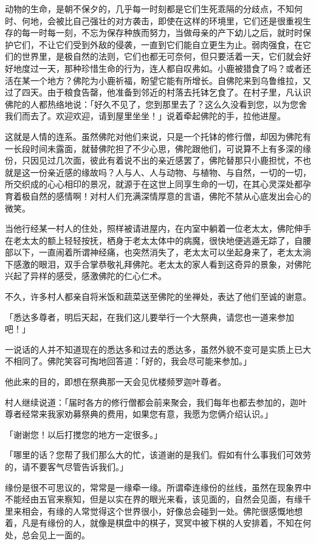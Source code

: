 \documentclass[twoside,openany]{book}
\begin{document}
动物的生命，是朝不保夕的，几乎每一时刻都是它们生死乖隔的分歧点，不知何时、何地，会被比自己强壮的对方袭击，即使在这样的环境里，它们还是很重视生存的每一时每一刻，不忘为保存种族而努力，当做母亲的产下幼儿之后，就时时保护它们，不让它们受到外敌的侵袭，一直到它们能自立更生为止。弱肉强食，在它们的世界里，是极自然的法则，它们也都无可奈何，但只要活着一天，它们就会好好地度过一天，那种珍惜生命的行为，连人都自叹弗如。小鹿被猎食了吗？或者还活在某一个地方？佛陀为小鹿祈福，盼望它能有所增长。自佛陀来到乌鲁维拉，又过了四天。由于粮食告罄，他准备到邻近的村落去托钵乞食了。在村子里，凡认识佛陀的人都热络地说：「好久不见了，您到那里去了？这么久没看到您，以为您舍我们而去了。欢迎欢迎，请到屋里坐坐！」说着牵起佛陀的手，拉他进屋。

这就是人情的连系。虽然佛陀对他们来说，只是一个托钵的修行僧，却因为佛陀有一长段时间未露面，就替佛陀担了不少心思，佛陀跟他们，可说算不上有多深的缘份，只因见过几次面，彼此有着说不出的亲近感罢了，佛陀替那只小鹿担忧，不也就是这一份亲近感的缘故吗？人与人、人与动物、与植物、与自然，一切的一切，所交织成的心心相印的景况，就源于在这世上同享生命的一切，在其心灵深处都孕育着极自然的感情啊！对村人们充满深情厚意的言语，佛陀不禁从心底发出会心的微笑。

当他行经某一村人的住处，照样被请进屋内，在内室中躺着一位老太太，佛陀伸手在老太太的额上轻轻按抚，栖身于老太太体中的病魔，很快地便逃遁无踪了，自腰部以下，一直闹着所谓神经痛，也突然消失了，老太太可以坐起身来了，老太太淌下感激的眼泪，双手合掌恭敬礼拜佛陀。老太太的家人看到这奇异的景象，对佛陀兴起了异样的感受，感激佛陀的仁心仁术。

不久，许多村人都亲自将米饭和蔬菜送至佛陀的坐禅处，表达了他们至诚的谢意。

「悉达多尊者，明后天起，在我们这儿要举行一个大祭典，请您也一道来参加吧！」

一说话的人并不知道现在的悉达多和过去的悉达多，虽然外貌不变可是实质上已大不相同了。佛陀笑容可掏地回答道：「好的，我会尽可能来参加。」

他此来的目的，即想在祭典那一天会见优楼频罗迦叶尊者。

村人继续说道：「届时各方的修行僧都会前来聚会，我们每年也都去参加的，迦叶尊者经常来我家劝募祭典的费用，如果您有意，我愿为您俩介绍认识。」

「谢谢您！以后打搅您的地方一定很多。」

「哪里的话？您帮了我们那么大的忙，该道谢的是我们。假如有什么事我们可效劳的，请不要客气尽管告诉我们。」

缘份是很不可思议的，常常是一缘牵一缘。所谓牵连缘份的丝线，虽然在现象界中不能经由五官来察知，但是以实在界的眼光来看，该见面的，自然会见面，有缘千里来相会，有缘的人常觉得这个世界很小，好像总会碰到一处。佛陀很感慨地想着，凡是有缘份的人，就像是棋盘中的棋子，冥冥中被下棋的人安排着，不知在何处，总会见上一面的。
\end{document}

